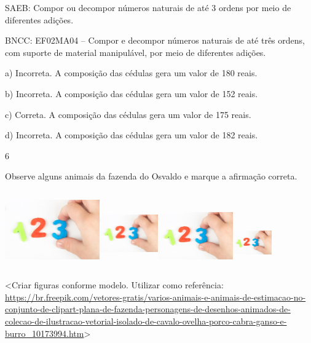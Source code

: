 \begin{escolha}
\begin{escolha}
{{{{SAEB: Compor ou decompor números naturais de até 3 ordens por
meio de diferentes adições.

BNCC: EF02MA04 -- Compor e decompor números naturais de até três ordens,
com suporte de material manipulável, por meio de diferentes adições.

a) Incorreta. A composição das cédulas gera um valor de 180 reais.

b) Incorreta. A composição das cédulas gera um valor de 152 reais.

c) Correta. A composição das cédulas gera um valor de 175 reais.

d) Incorreta. A composição das cédulas gera um valor de 182 reais.

\num{6}

Observe alguns animais da fazenda do Osvaldo e marque a afirmação
correta.

\includegraphics[width=1.60383in,height=1.29919in]{media/image114.png}\includegraphics[width=0.99316in,height=1.17006in]{media/image114.png}\includegraphics[width=1.27263in,height=1.09078in]{media/image114.png}\includegraphics[width=0.65433in,height=0.85550in]{media/image114.png}

\textless{}Criar figuras conforme modelo. Utilizar como referência:
\url{https://br.freepik.com/vetores-gratis/varios-animais-e-animais-de-estimacao-no-conjunto-de-clipart-plana-de-fazenda-personagens-de-desenhos-animados-de-colecao-de-ilustracao-vetorial-isolado-de-cavalo-ovelha-porco-cabra-ganso-e-burro_10173994.htm}\textgreater{}

}}}}
\end{escolha}
\end{escolha}
